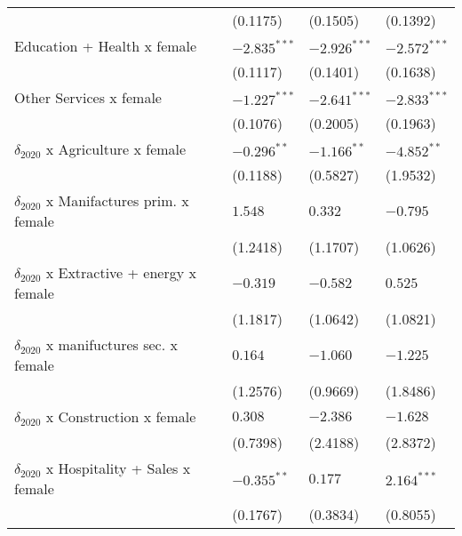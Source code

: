 \begin{tabular}{llll}
                                                   &           (0.1175) &           (0.1505) &           (0.1392) \\
Education + Health x female                        &     $-2.835^{***}$ &     $-2.926^{***}$ &     $-2.572^{***}$ \\
                                                   &           (0.1117) &           (0.1401) &           (0.1638) \\
Other Services x female                            &     $-1.227^{***}$ &     $-2.641^{***}$ &     $-2.833^{***}$ \\
                                                   &           (0.1076) &           (0.2005) &           (0.1963) \\
$\delta_{2020}$ x Agriculture x female             &      $-0.296^{**}$ &      $-1.166^{**}$ &      $-4.852^{**}$ \\
                                                   &           (0.1188) &           (0.5827) &           (1.9532) \\
$\delta_{2020}$ x Manifactures prim. x female      &            $1.548$ &            $0.332$ &           $-0.795$ \\
                                                   &           (1.2418) &           (1.1707) &           (1.0626) \\
$\delta_{2020}$ x Extractive + energy x female     &           $-0.319$ &           $-0.582$ &            $0.525$ \\
                                                   &           (1.1817) &           (1.0642) &           (1.0821) \\
$\delta_{2020}$ x manifuctures sec. x female       &            $0.164$ &           $-1.060$ &           $-1.225$ \\
                                                   &           (1.2576) &           (0.9669) &           (1.8486) \\
$\delta_{2020}$ x Construction x female            &            $0.308$ &           $-2.386$ &           $-1.628$ \\
                                                   &           (0.7398) &           (2.4188) &           (2.8372) \\
$\delta_{2020}$ x Hospitality + Sales x female     &      $-0.355^{**}$ &            $0.177$ &      $2.164^{***}$ \\
                                                   &           (0.1767) &           (0.3834) &           (0.8055) \\

\end{tabular}
